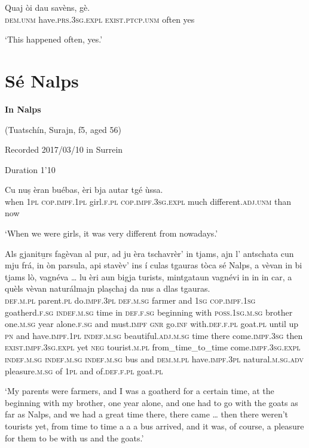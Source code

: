 \begin{linenumbers}
\gll Quaj òi dau savèns, gè.\\
  \textsc{dem.unm} have.\textsc{prs.3sg.expl} \textsc{exist.ptcp.unm} often yes\\
\end{linenumbers}
\medskip
\glt `This happened often, yes.'
\medskip

\section{Sé Nalps}

\noindent
\textbf{In Nalps}

\noindent
(Tuatschín, Surajn, f5, aged 56)

\noindent
Recorded 2017/03/10 in Surrein

\noindent
Duration 1'10
\bigskip

\begin{linenumbers}
\gll    Cu nuṣ èran buébas, èri bja autar tgé ùssa. \\
 when \textsc{1pl} \textsc{cop.impf.1pl} girl.\textsc{f.pl} \textsc{cop.impf.3sg.expl} much different.\textsc{adj.unm} than now \\
\end{linenumbers}
\medskip
\glt `When we were girls, it was very different from nowadays.'
\medskip

\begin{linenumbers}
\gll    Als gjanitu̱rs fagèvan al pur, ad ju èra tschavrèr’ in tjams, ajn l’ antschata cun mju frá, in òn parsula, api stavèv’ ins í culas tgauras tòca sé Nalps, a vèvan in bi tjams lò, vagnéva … lu èri aun bigja turists, mintgataun vagnévi in in in car, a quèls vèvan naturálmajn plaṣchaj da nus a dlas tgauras. \\
\textsc{def.m.pl} parent.\textsc{pl} do.\textsc{impf.3pl} \textsc{def.m.sg} farmer and \textsc{1sg} \textsc{cop.impf.1sg} goatherd.\textsc{f.sg} \textsc{indef.m.sg} time in \textsc{def.f.sg} beginning with \textsc{poss.1sg.m.sg} brother one.\textsc{m.sg} year alone.\textsc{f.sg} and must.\textsc{impf} \textsc{gnr} go.\textsc{inf} with.\textsc{def.f.pl} goat.\textsc{pl} until up \textsc{pn} and have.\textsc{impf.1pl} \textsc{indef.m.sg} beautiful.\textsc{adj.m.sg} time there come.\textsc{impf.3sg} {} then \textsc{exist.impf.3sg.expl} yet \textsc{neg} tourist.\textsc{m.pl} from\_time\_to\_time come.\textsc{impf.3sg.expl} \textsc{indef.m.sg} \textsc{indef.m.sg} \textsc{indef.m.sg} bus and \textsc{dem.m.pl} have.\textsc{impf.3pl} natural.\textsc{m.sg.adv}  pleasure.\textsc{m.sg} of \textsc{1pl} and of.\textsc{def.f.pl} goat.\textsc{pl} \\
\end{linenumbers}
\medskip
\glt `My parents were farmers, and I was a goatherd for a certain time, at the beginning with my brother, one year alone, and one had to go with the goats as far as Nalps, and we had a great time there, there came … then there weren’t tourists yet, from time to time a a a bus arrived, and it was, of course, a pleasure for them to be with us and the goats.'
\medskip

